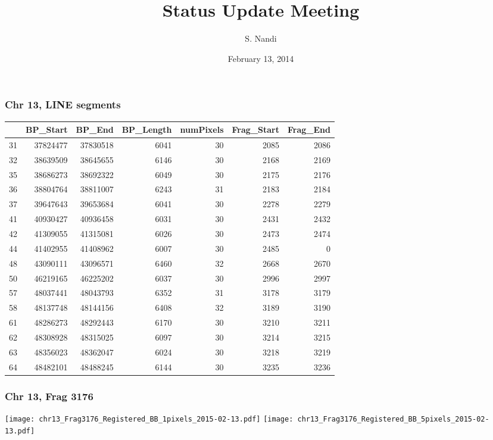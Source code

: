 \documentclass[10pt,dvipsnames,table]{beamer}
\title[Status Update Feb, 2015]{Status Update Meeting}
\author{S. Nandi}
\institute[LMCG]{LMCG \\
 University of Wisconsin-Madison}
\date{February 13, 2014}
\begin{document}
\setlength{\baselineskip}{16truept}
\frame{\maketitle}

\begin{frame}
\frametitle{Chr 13, LINE segments}
\begin{table}[ht]
\centering
\begin{tabular}{rrrrrrr}
  \hline
 & BP\_Start & BP\_End & BP\_Length & numPixels & Frag\_Start & Frag\_End \\ 
  \hline
31 & 37824477 & 37830518 & 6041 & 30 & 2085 & 2086 \\ 
  32 & 38639509 & 38645655 & 6146 & 30 & 2168 & 2169 \\ 
  35 & 38686273 & 38692322 & 6049 & 30 & 2175 & 2176 \\ 
  36 & 38804764 & 38811007 & 6243 & 31 & 2183 & 2184 \\ 
  37 & 39647643 & 39653684 & 6041 & 30 & 2278 & 2279 \\ 
  41 & 40930427 & 40936458 & 6031 & 30 & 2431 & 2432 \\ 
  42 & 41309055 & 41315081 & 6026 & 30 & 2473 & 2474 \\ 
  44 & 41402955 & 41408962 & 6007 & 30 & 2485 & 0 \\ 
  48 & 43090111 & 43096571 & 6460 & 32 & 2668 & 2670 \\ 
  50 & 46219165 & 46225202 & 6037 & 30 & 2996 & 2997 \\ 
  57 & 48037441 & 48043793 & 6352 & 31 & 3178 & 3179 \\ 
  58 & 48137748 & 48144156 & 6408 & 32 & 3189 & 3190 \\ 
  61 & 48286273 & 48292443 & 6170 & 30 & 3210 & 3211 \\ 
  62 & 48308928 & 48315025 & 6097 & 30 & 3214 & 3215 \\ 
  63 & 48356023 & 48362047 & 6024 & 30 & 3218 & 3219 \\ 
  64 & 48482101 & 48488245 & 6144 & 30 & 3235 & 3236 \\ 
   \hline
\end{tabular}
\end{table}
\end{frame}

\begin{frame}
\frametitle{Chr 13, Frag 3176}
\begin{center}
\texttt{[image: chr13\_Frag3176\_Registered\_BB\_1pixels\_2015-02-13.pdf]} 
\texttt{[image: chr13\_Frag3176\_Registered\_BB\_5pixels\_2015-02-13.pdf]} 
\end{center}
\end{frame}
\end{document}
